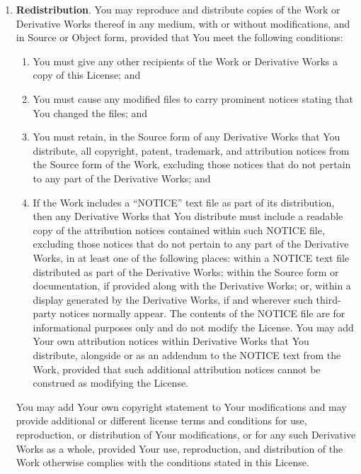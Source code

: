 \documentclass{pracamgr}
\begin{document}
\begin{enumerate}
\item \textbf{Redistribution}. You may reproduce and distribute copies
  of the Work or Derivative Works thereof in any medium, with or
  without modifications, and in Source or Object form, provided that
  You meet the following conditions:

  \begin{enumerate}[label=(\alph*)]
  \item You must give any other recipients of the Work or
    Derivative Works a copy of this License; and

  \item You must cause any modified files to carry prominent notices
    stating that You changed the files; and

  \item You must retain, in the Source form of any Derivative Works
    that You distribute, all copyright, patent, trademark, and
    attribution notices from the Source form of the Work, excluding
    those notices that do not pertain to any part of the Derivative
    Works; and

  \item If the Work includes a ``NOTICE'' text file as part of its
    distribution, then any Derivative Works that You distribute must
    include a readable copy of the attribution notices contained
    within such NOTICE file, excluding those notices that do not
    pertain to any part of the Derivative Works, in at least one of
    the following places: within a NOTICE text file distributed as
    part of the Derivative Works; within the Source form or
    documentation, if provided along with the Derivative Works; or,
    within a display generated by the Derivative Works, if and
    wherever such third-party notices normally appear. The contents of
    the NOTICE file are for informational purposes only and do not
    modify the License. You may add Your own attribution notices
    within Derivative Works that You distribute, alongside or as an
    addendum to the NOTICE text from the Work, provided that such
    additional attribution notices cannot be construed as modifying
    the License.
  \end{enumerate}

  You may add Your own copyright statement to Your modifications and
  may provide additional or different license terms and conditions for
  use, reproduction, or distribution of Your modifications, or for any
  such Derivative Works as a whole, provided Your use, reproduction,
  and distribution of the Work otherwise complies with the conditions
  stated in this License.


\end{enumerate}
\end{document}
